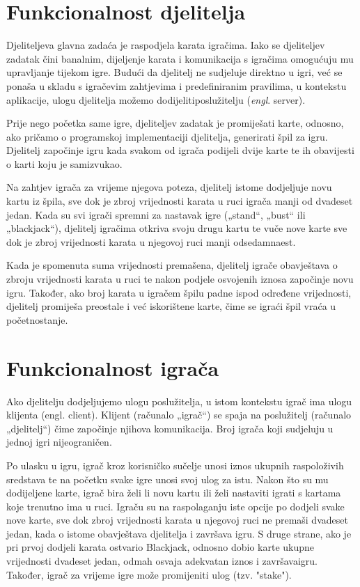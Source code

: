 \documentclass{IEEEcsmag}
\begin{document}
\section{Funkcionalnost djelitelja}
\label{sec:djelitelj}
\vspace{5mm}
Djeliteljeva glavna zadaća je raspodjela karata igračima. Iako se djeliteljev zadatak čini banalnim, dijeljenje karata i komunikacija s igračima omogućuju mu upravljanje tijekom igre. Budući da djelitelj ne sudjeluje direktno u igri, već se ponaša u skladu s igračevim zahtjevima i predefiniranim pravilima, u kontekstu aplikacije, ulogu djelitelja možemo dodijeliti\break poslužitelju (\textit{engl}. server).

Prije nego početka same igre, djeliteljev zadatak je promiješati karte, odnosno, ako pričamo o programskoj implementaciji djelitelja, generirati špil za igru. Djelitelj započinje igru kada svakom od igrača podijeli dvije karte te ih obavijesti o karti koju je sam\break izvukao.

Na zahtjev igrača za vrijeme njegova poteza, djelitelj istome dodjeljuje novu kartu iz špila, sve dok je zbroj vrijednosti karata u ruci igrača manji od dvadeset jedan. Kada su svi igrači spremni za nastavak igre („stand“, „bust“ ili „blackjack“), djelitelj igračima otkriva svoju drugu kartu te vuče nove karte sve dok je zbroj vrijednosti karata u njegovoj ruci manji od\break sedamnaest.

Kada je spomenuta suma vrijednosti premašena, djelitelj igrače obavještava o zbroju vrijednosti karata u ruci te nakon podjele osvojenih iznosa započinje novu igru. Također, ako broj karata u igračem špilu padne ispod određene vrijednosti, djelitelj promiješa preostale i već iskorištene karte, čime se igraći špil vraća u početno\break stanje.


\section{Funkcionalnost igrača}
\label{sec:igrac}
\vspace{5mm}
Ako djelitelju dodjeljujemo ulogu poslužitelja, u istom kontekstu igrač ima ulogu klijenta (engl. client). Klijent (računalo „igrač“) se spaja na poslužitelj (računalo „djelitelj“) čime započinje njihova komunikacija. Broj igrača koji sudjeluju u jednoj igri nije\break ograničen. 

Po ulasku u igru, igrač kroz korisničko sučelje unosi iznos ukupnih raspoloživih sredstava te na početku svake igre unosi svoj ulog za istu. Nakon što su mu dodijeljene karte, igrač bira želi li novu kartu ili želi nastaviti igrati s kartama koje trenutno ima u ruci. Igraču su na raspolaganju iste opcije po dodjeli svake nove karte, sve dok zbroj vrijednosti karata u njegovoj ruci ne premaši dvadeset jedan, kada o istome obavještava djelitelja i završava igru. S druge strane, ako je pri prvoj dodjeli karata ostvario Blackjack, odnosno dobio karte ukupne vrijednosti dvadeset jedan, odmah osvaja adekvatan iznos i završava\break igru. Također, igrač za vrijeme igre može promijeniti ulog (tzv. "stake").
\end{document}
